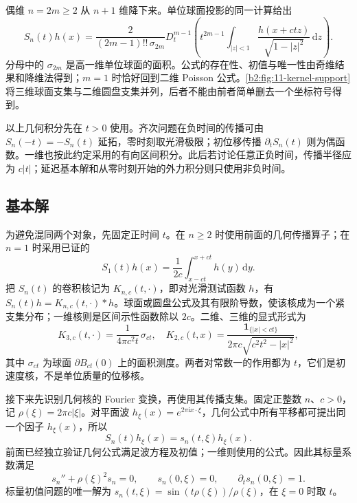 偶维 \(n=2m\geq2\) 从 \(n+1\) 维降下来。单位球面投影的同一计算给出
\begin{equation}\label{b2:eq:11-even-wave}
 S_n(t)h(x)=\dfrac2{(2m-1)!!\,\sigma_{2m}}
 D_t^{m-1}\left(t^{2m-1}
 \int_{|z|<1}\dfrac{h(x+ctz)}{\sqrt{1-|z|^2}}\,\mathrm{d}z\right).
\end{equation}
分母中的 \(\sigma_{2m}\) 是高一维单位球面的面积。公式的存在性、初值与唯一性由奇维结果和降维法得到；\(m=1\) 时恰好回到二维 Poisson 公式。\cref{b2:fig:11-kernel-support}将三维球面支集与二维圆盘支集并列，后者不能由前者简单删去一个坐标符号得到。


以上几何积分先在 \(t>0\) 使用。齐次问题在负时间的传播可由 \(S_n(-t)=-S_n(t)\) 延拓，零时刻取光滑极限；初位移传播 \(\partial_tS_n(t)\) 则为偶函数。一维也按此约定采用的有向区间积分。此后若讨论任意正负时间，传播半径应为 \(c|t|\)；延迟基本解和从零时刻开始的外力积分则只使用非负时间。

\subsection{基本解}
\label{b2:subsec:110302}

为避免混同两个对象，先固定正时间 \(t\)。在 \(n\geq2\) 时使用前面的几何传播算子；在 \(n=1\) 时采用已证的
\[
 S_1(t)h(x)=\frac1{2c}\int_{x-ct}^{x+ct}h(y)\,\mathrm{d}y.
\]
把 \(S_n(t)\) 的卷积核记为 \(K_{n,c}(t,\cdot)\)，即对光滑测试函数 \(h\)，有 \(S_n(t)h=K_{n,c}(t,\cdot)*h\)。球面或圆盘公式及其有限阶导数，使该核成为一个紧支集分布；一维核则是区间示性函数除以 \(2c\)。二维、三维的显式形式为
\[
 K_{3,c}(t,\cdot)=\dfrac1{4\pi c^2t}\,\sigma_{ct},\quad
 K_{2,c}(t,x)=\dfrac{\mathbf1_{\{|x|<ct\}}}{2\pi c\sqrt{c^2t^2-|x|^2}},
\]
其中 \(\sigma_{ct}\) 为球面 \(\partial B_{ct}(0)\) 上的面积测度。两者对常数一的作用都为 \(t\)，它们是初速度核，不是单位质量的位移核。

\ProseParagraphBreak

接下来先识别几何核的 Fourier 变换，再使用其传播支集。固定正整数 \(n\)、\(c>0\)，记 \(\rho(\xi)=2\pi c|\xi|\)。对平面波 \(h_\xi(x)=e^{2\pi\mathrm{i}x\cdot\xi}\)，几何公式中所有平移都可提出同一个因子 \(h_\xi(x)\)，所以
\[
 S_n(t)h_\xi(x)=s_n(t,\xi)h_\xi(x).
\]
前面已经独立验证几何公式满足波方程及初值；一维则使用的公式。因此其标量系数满足
\[
 s_n''+\rho(\xi)^2s_n=0,\qquad s_n(0,\xi)=0,\qquad
 \partial_ts_n(0,\xi)=1.
\]
标量初值问题的唯一解为 \(s_n(t,\xi)=\sin(t\rho(\xi))/\rho(\xi)\)，在 \(\xi=0\) 时取 \(t\)。

